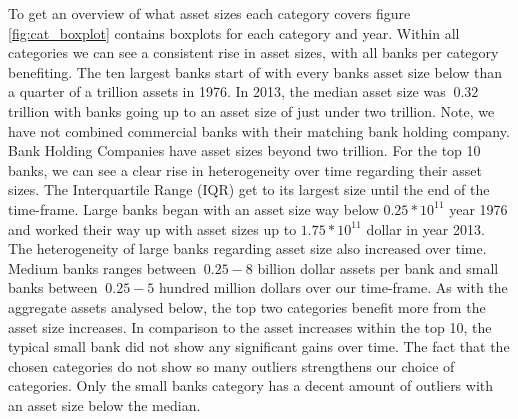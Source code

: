 \documentclass[12pt, a4paper]{article} %
\begin{document}
To get an overview of what asset sizes each category covers figure \ref{fig:cat_boxplot} contains boxplots for each category and year. Within all categories we can see a consistent rise in asset sizes, with all banks per category benefiting.
The ten largest banks start of with every banks asset size below than a quarter of a trillion assets in 1976. In 2013, the median asset size was $~0.32$ trillion with banks going up to an asset size of just under two trillion. Note, we have not combined commercial banks with their matching bank holding company. Bank Holding Companies have asset sizes beyond two trillion. For the top 10 banks, we can see a clear rise in heterogeneity over time regarding their asset sizes. The Interquartile Range (IQR) get to its largest size until the end of the time-frame.
Large banks began with an asset size way below $0.25*10^11$ year 1976 and worked their way up with asset sizes up to $1.75*10^11$ dollar in year 2013. The heterogeneity of large banks regarding asset size also increased over time. 
Medium banks ranges between $~0.25-8$ billion dollar assets per bank and small banks between $~0.25-5$ hundred million dollars over our time-frame. As with the aggregate assets analysed below, the top two categories benefit more from the asset size increases. In comparison to the asset increases within the top 10, the typical small bank did not show any significant gains over time. The fact that the chosen categories do not show so many outliers strengthens our choice of categories. Only the small banks category has a decent amount of outliers with an asset size below the median. 
\end{document}
